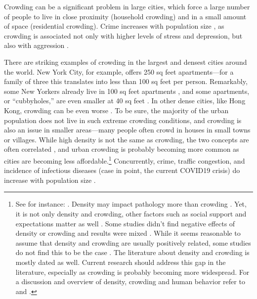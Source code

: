 \documentclass[11pt, letterpaper]{article}
\begin{document}
\begin{spacing}{1.4}
%
Crowding can be a significant problem in large cities, which force a large number of people to live in close proximity (household crowding) and in a small amount of space (residential crowding). Crime increases with population size \citep{bettencourt10b}, as crowding is associated not only with higher levels of stress and depression, but also with aggression \citep{regoeczi2008,calhoun62}. 

There are striking examples of crowding in the largest and densest cities around the world. New York City, for example, offers 250 sq feet apartments---for a family of three this translates into less than 100 sq feet per person. Remarkably, some New Yorkers already live in 100 sq feet apartments \citep{abc,yoneda,dailynews}, and some apartments, or ``cubbyholes,'' are even smaller at 40 sq feet \citep{newyorktimes}. In other dense cities, like Hong Kong, crowding can be even worse \citep{newyorktimes2}. To
  be sure, the majority of the urban population does not live in such extreme crowding conditions, and crowding is also an issue in smaller areas---many people often crowd in houses in small towns or villages.
  While high density is not the same as crowding, the two concepts are often
  correlated \citep{meyer13}, and urban crowding is probably becoming more
  common  as cities are becoming less affordable.\footnote{See for instance: \citet{misraCL15oct6,floridaCL18apr11,weinbergCL16aug11,solariMISC19apr24,schuetzMISC19may7,kotkin_db_mar20_13}.
%    
Density may impact pathology more than crowding \citep{levy1974effects}. Yet, it is not only density and crowding, other  factors such as social support and expectations matter as well \citep{cassel2017health,chan78}. Some
  studies didn't find negative effects of density or crowding and results were  mixed \citep{collette1976urban}. While it seems  reasonable to assume that density and crowding are usually positively related, some studies do not
  find  this to be the case \citep{webb1975meaning,rodgers1982density}. 
 The literature about density
  and crowding is mostly dated as well. Current research should address this gap in the literature, especially as crowding is probably becoming more widespread.
%
For a discussion and overview of density, crowding and human behavior refer to \citet{boots1979population,choldin1978urban} and \citet{ramsden09}.} 
% 
Concurrently,  crime, traffic congestion, and incidence of infectious diseases ({case in point, the current COVID19 crisis}) do increase with population size \citep{bettencourt10,bettencourt10b,bettencourt07}.


\end{spacing}
\end{document}
